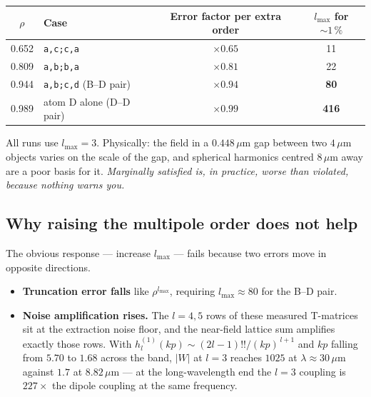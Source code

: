 \documentclass[11pt,a4paper]{article}
\newcommand{\um}{\ensuremath{\,\mu\mathrm{m}}}
\newcommand{\lmax}{\ensuremath{l_{\max}}}
\theoremstyle{plain}
\theoremstyle{definition}
\begin{document}
\begin{center}\small
\begin{tabular}{@{}clcc@{}}
\toprule
$\rho$ & Case & Error factor per extra order & $\lmax$ for $\sim\!1\,\%$ \\
\midrule
0.652 & \texttt{a,c;c,a} & $\times 0.65$ & 11 \\
0.809 & \texttt{a,b;b,a} & $\times 0.81$ & 22 \\
\textcolor{bad}{0.944} & \textcolor{bad}{\texttt{a,b;c,d} (B--D pair)} & \textcolor{bad}{$\times 0.94$} & \textcolor{bad}{\textbf{80}} \\
\textcolor{bad}{0.989} & \textcolor{bad}{atom D alone (D--D pair)} & \textcolor{bad}{$\times 0.99$} & \textcolor{bad}{\textbf{416}} \\
\bottomrule
\end{tabular}
\end{center}

\noindent
All runs use $\lmax = 3$. Physically: the field in a $0.448\um$ gap between two
$4\um$ objects varies on the scale of the gap, and spherical harmonics centred
$8\um$ away are a poor basis for it. \emph{Marginally satisfied is, in practice,
worse than violated, because nothing warns you.}

\subsection{Why raising the multipole order does not help}
\label{sec:lmax}

The obvious response --- increase $\lmax$ --- fails because two errors move in
opposite directions.

\begin{itemize}[leftmargin=*,itemsep=2pt]
\item \textbf{Truncation error falls} like $\rho^{\lmax}$, requiring
      $\lmax \approx 80$ for the B--D pair.
\item \textbf{Noise amplification rises.} The $l = 4, 5$ rows of these measured
      T-matrices sit at the extraction noise floor, and the near-field lattice sum
      amplifies exactly those rows. With $h^{(1)}_l(kp) \sim
      (2l-1)!!/(kp)^{\,l+1}$ and $kp$ falling from $5.70$ to $1.68$ across the
      band, $|W|$ at $l = 3$ reaches $1025$ at $\lambda \approx 30\um$ against
      $1.7$ at $8.82\um$ --- at the long-wavelength end the $l = 3$ coupling is
      $227\times$ the dipole coupling at the same frequency.
\end{itemize}
\end{document}
